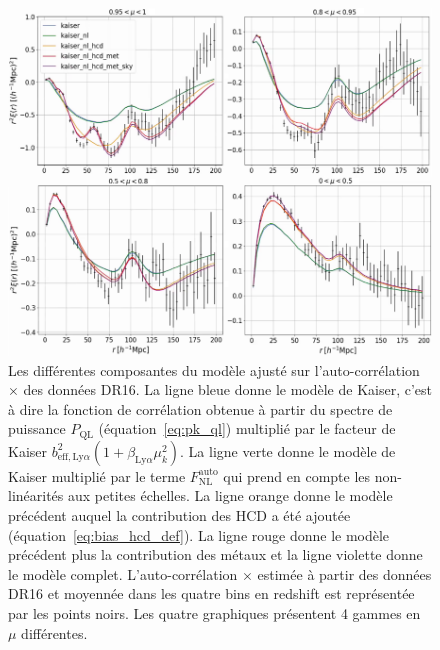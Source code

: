 \begin{figure}
  \centering
  \includegraphics[scale=0.5]{cf_models}
  \caption{Les différentes composantes du modèle ajusté sur l'auto-corrélation \lya{}$\times$\lya{} des données DR16.
    La ligne bleue donne le modèle de Kaiser, c'est à dire la fonction de corrélation obtenue à partir du spectre de puissance $P_{\mathrm{QL}}$ (équation~\ref{eq:pk_ql}) multiplié par le facteur de Kaiser $b_{\mathrm{eff},\mathrm{Ly}\alpha}^2 (1 + \beta_{\mathrm{Ly}\alpha} \mu_k^2)$. La ligne verte donne le modèle de Kaiser multiplié par le terme $F_{\mathrm{NL}}^{\mathrm{auto}}$ qui prend en compte les non-linéarités aux petites échelles. La ligne orange donne le modèle précédent auquel la contribution des HCD a été ajoutée (équation~\ref{eq:bias_hcd_def}). La ligne rouge donne le modèle précédent plus la contribution des métaux et la ligne violette donne le modèle complet. L'auto-corrélation \lya{}$\times$\lya{} estimée à partir des données DR16 et moyennée dans les quatre bins en redshift est représentée par les points noirs.
Les quatre graphiques présentent 4 gammes en $\mu$ différentes.}
  \label{fig:cf_models}
\end{figure}
